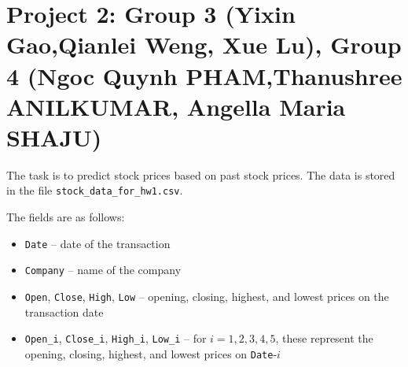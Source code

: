 \documentclass{article}
\begin{document}




\section*{Project 2: Group 3 (Yixin Gao,Qianlei Weng, Xue Lu), Group 4 (Ngoc Quynh PHAM,Thanushree ANILKUMAR, Angella Maria SHAJU) }
The task is to predict stock prices based on past stock prices. The data is stored in the file \lstinline$stock_data_for_hw1.csv$.

The fields are as follows: \begin{itemize} \item \lstinline$Date$ -- date of the transaction \item \lstinline$Company$ -- name of the company \item \lstinline$Open$, \lstinline$Close$, \lstinline$High$, \lstinline$Low$ -- opening, closing, highest, and lowest prices on the transaction date \item \lstinline$Open_i$, \lstinline$Close_i$, \lstinline$High_i$, \lstinline$Low_i$ -- for $i=1,2,3,4,5$, these represent the opening, closing, highest, and lowest prices on \lstinline$Date$-$i$ \end{itemize}
\end{document}
